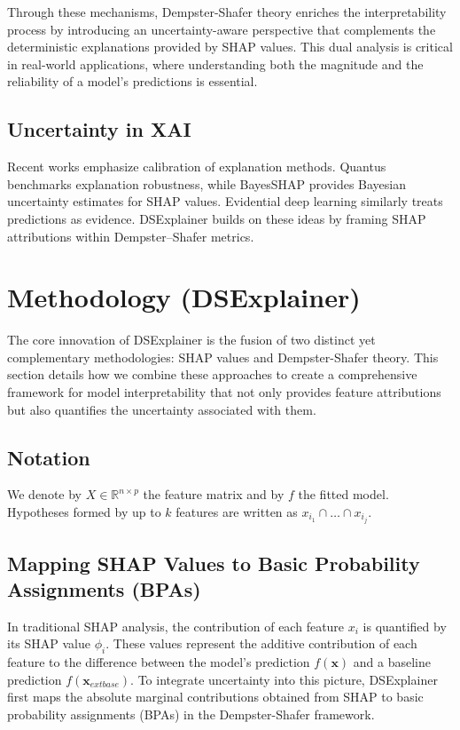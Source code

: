 \documentclass[acmlarge]{acmart}
\begin{document}
Through these mechanisms, Dempster-Shafer theory enriches the interpretability process by introducing an uncertainty-aware perspective that complements the deterministic explanations provided by SHAP values. This dual analysis is critical in real-world applications, where understanding both the magnitude and the reliability of a model’s predictions is essential.
\subsection{Uncertainty in XAI}
Recent works emphasize calibration of explanation methods. Quantus benchmarks explanation robustness\cite{hedstrom2023quantus}, while BayesSHAP provides Bayesian uncertainty estimates for SHAP values\cite{slack2021reliable}. Evidential deep learning similarly treats predictions as evidence\cite{sensoy2018edl}. DSExplainer builds on these ideas by framing SHAP attributions within Dempster--Shafer metrics.



\section{Methodology (DSExplainer)}
\label{sec:combining}
The core innovation of DSExplainer is the fusion of two distinct yet complementary methodologies: SHAP values and Dempster-Shafer theory. This section details how we combine these approaches to create a comprehensive framework for model interpretability that not only provides feature attributions but also quantifies the uncertainty associated with them.
\subsection{Notation}
We denote by $X \in \mathbb{R}^{n \times p}$ the feature matrix and by $f$ the fitted model. Hypotheses formed by up to $k$ features are written as $x_{i_1} \cap \dots \cap x_{i_j}$.

\subsection{Mapping SHAP Values to Basic Probability Assignments (BPAs)}

In traditional SHAP analysis, the contribution of each feature \( x_i \) is quantified by its SHAP value \( \phi_i \). These values represent the additive contribution of each feature to the difference between the model's prediction \( f(\mathbf{x}) \) and a baseline prediction \( f(\mathbf{x}_{ext{base}}) \). To integrate uncertainty into this picture, DSExplainer first maps the absolute marginal contributions obtained from SHAP to basic probability assignments (BPAs) in the Dempster-Shafer framework.
\end{document}
